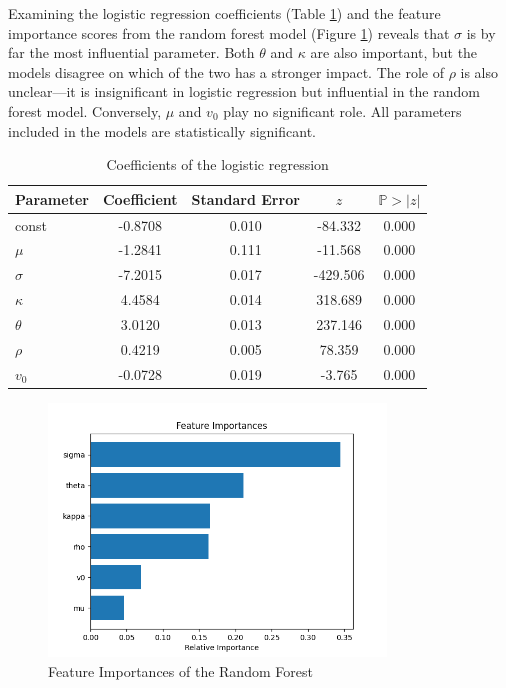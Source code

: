 Examining the logistic regression coefficients (Table \ref{tab:logistic_regression_coefficients}) and the feature importance scores from the random forest model (Figure \ref{fig:feature_importances}) reveals that $\sigma$ is by far the most influential parameter. Both $\theta$ and $\kappa$ are also important, but the models disagree on which of the two has a stronger impact. The role of $\rho$ is also unclear—it is insignificant in logistic regression but influential in the random forest model. Conversely, $\mu$ and $v_0$ play no significant role. All parameters included in the models are statistically significant.

\begin{table}
    \centering
    \begin{tabular}{l|c|c|c|c}
        \textbf{Parameter} & \textbf{Coefficient} & \textbf{Standard Error} & $z$ & $\mathbb{P}>\vert z\vert$ \\
        \hline
        const & -0.8708 & 0.010 & -84.332 & 0.000 \\
        $\mu$ & -1.2841 & 0.111 & -11.568 & 0.000 \\
        $\sigma$ & -7.2015 & 0.017 & -429.506 & 0.000 \\
        $\kappa$ & 4.4584 & 0.014 & 318.689 & 0.000 \\
        $\theta$ & 3.0120 & 0.013 & 237.146 & 0.000 \\
        $\rho$ & 0.4219 & 0.005 & 78.359 & 0.000 \\
        $v_0$ & -0.0728 & 0.019 & -3.765 & 0.000
    \end{tabular}
    \caption{Coefficients of the logistic regression}
    \label{tab:logistic_regression_coefficients}
\end{table}

\begin{figure}
    \centering
    \includegraphics[width=0.8\textwidth]{img/feature_importances.png}
    \caption{Feature Importances of the Random Forest}
    \label{fig:feature_importances}
\end{figure}

